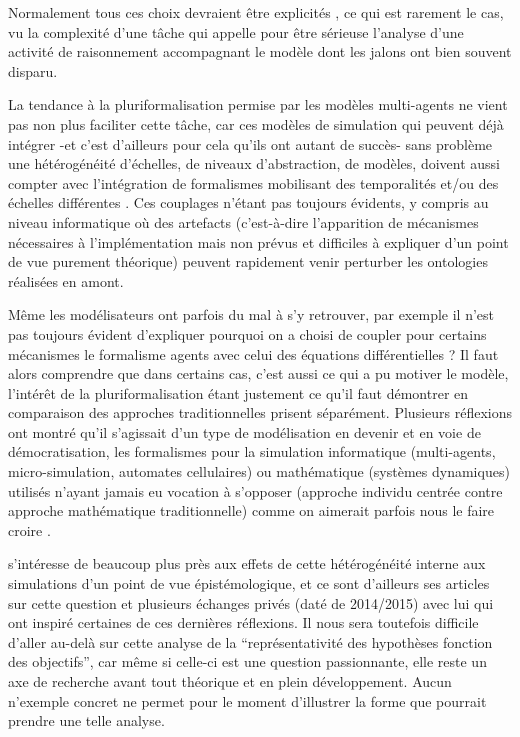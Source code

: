 Normalement tous ces choix devraient être explicités \autocite{Varenne2013b}, ce qui est rarement le cas, vu la complexité d'une tâche qui appelle pour être sérieuse l'analyse d'une activité de raisonnement accompagnant le modèle dont les jalons ont bien souvent disparu.

La tendance à la pluriformalisation  permise par les modèles multi-agents ne vient pas non plus faciliter cette tâche, car ces modèles de simulation qui peuvent déjà intégrer -et c'est d'ailleurs pour cela qu'ils ont autant de succès- sans problème une hétérogénéité d'échelles, de niveaux d'abstraction, de modèles, doivent aussi compter avec l'intégration de formalismes mobilisant des temporalités et/ou des échelles différentes \autocites{Varenne2008,Varenne2012a}. Ces couplages n'étant pas toujours évidents, y compris au niveau informatique où des artefacts (c'est-à-dire l'apparition de mécanismes nécessaires à l'implémentation  mais non prévus et difficiles à expliquer d'un point de vue purement théorique) peuvent rapidement venir perturber les ontologies réalisées en amont.

Même les modélisateurs ont parfois du mal à s'y retrouver, par exemple il n'est pas toujours évident d'expliquer pourquoi on a choisi de coupler pour certains mécanismes le formalisme agents avec celui des équations différentielles ? Il faut alors comprendre que dans certains cas, c'est aussi ce qui a pu motiver le modèle, l'intérêt de la pluriformalisation étant justement ce qu'il faut démontrer en comparaison des approches traditionnelles prisent séparément. Plusieurs réflexions ont montré qu'il s'agissait d'un type de modélisation en devenir et en voie de démocratisation, les formalismes pour la simulation informatique (multi-agents, micro-simulation, automates cellulaires) ou mathématique (systèmes dynamiques) utilisés n'ayant jamais eu vocation à s'opposer (approche individu centrée contre approche mathématique traditionnelle) comme on aimerait parfois nous le faire croire \autocites{Sanders2013, Banos2013}.

\textcite{Varenne2013b} s’intéresse de beaucoup plus près aux effets de cette hétérogénéité interne aux simulations d’un point de vue épistémologique, et ce sont d'ailleurs ses articles sur cette question \autocite{Varenne2013b} et plusieurs échanges privés (daté de 2014/2015) avec lui qui ont inspiré certaines de ces dernières réflexions. Il nous sera toutefois difficile d’aller au-delà sur cette analyse de la \enquote{représentativité des hypothèses fonction des objectifs}, car même si celle-ci est une question passionnante, elle reste un axe de recherche avant tout théorique et en plein développement. Aucun n'exemple concret ne permet pour le moment d'illustrer la forme que pourrait prendre une telle analyse.

